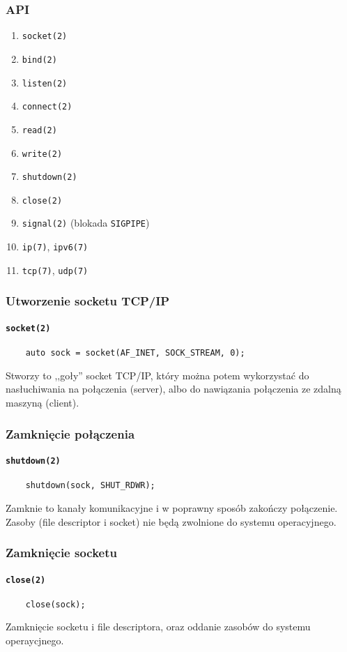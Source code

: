 \documentclass[aspectratio=169]{beamer}
\begin{document}
\begin{frame}
    \frametitle{API}

    \begin{enumerate}
        \item \texttt{socket(2)}
        \item \texttt{bind(2)}
        \item \texttt{listen(2)}
        \item \texttt{connect(2)}
        \item \texttt{read(2)}
        \item \texttt{write(2)}
        \item \texttt{shutdown(2)}
        \item \texttt{close(2)}
        \item \texttt{signal(2)} (blokada \texttt{SIGPIPE})
        \item \texttt{ip(7)}, \texttt{ipv6(7)}
        \item \texttt{tcp(7)}, \texttt{udp(7)}
    \end{enumerate}
\end{frame}

\begin{frame}[fragile]
    \frametitle{Utworzenie socketu TCP/IP}
    \framesubtitle{\texttt{socket(2)}}

    {\footnotesize
    \begin{lstlisting}
    auto sock = socket(AF_INET, SOCK_STREAM, 0);
    \end{lstlisting}}

    Stworzy to ,,goły'' socket TCP/IP, który można potem wykorzystać do
    nasłuchiwania na połączenia (server), albo do nawiązania połączenia ze
    zdalną maszyną (client).
\end{frame}

\begin{frame}[fragile]
    \frametitle{Zamknięcie połączenia}
    \framesubtitle{\texttt{shutdown(2)}}

    {\footnotesize
    \begin{lstlisting}
    shutdown(sock, SHUT_RDWR);
    \end{lstlisting}}

    Zamknie to kanały komunikacyjne i w poprawny sposób zakończy połączenie.
    Zasoby (file descriptor i socket) nie będą zwolnione do systemu
    operacyjnego.
\end{frame}

\begin{frame}[fragile]
    \frametitle{Zamknięcie socketu}
    \framesubtitle{\texttt{close(2)}}

    {\footnotesize
    \begin{lstlisting}
    close(sock);
    \end{lstlisting}}

    Zamknięcie socketu i file descriptora, oraz oddanie zasobów do systemu
    operaycjnego.
\end{frame}
\end{document}
